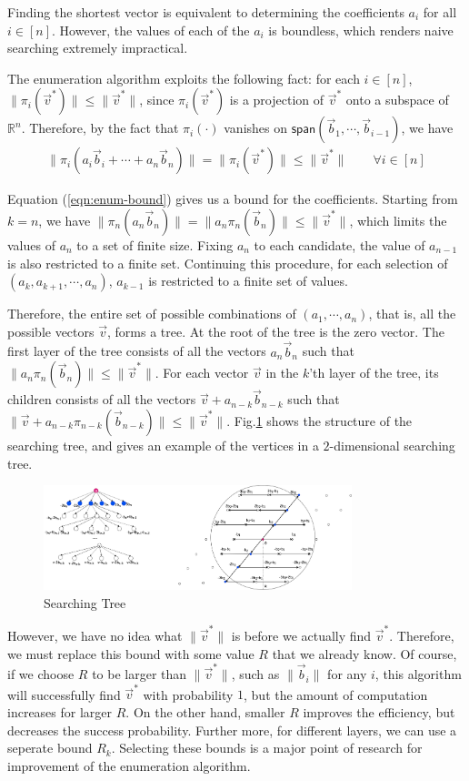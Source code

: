 \documentclass[11pt]{article}
\newcommand{\bbR}{\mathbb{R}}
\newcommand{\vb}{\vec{b}}
\newcommand{\vv}{\vec{v}}
\newcommand{\vvs}{\vec{v}^*}
\newcommand{\sspan}{\mathsf{span}}
\begin{document}
Finding the shortest vector is equivalent to determining the coefficients $a_i$ for all $i\in[n]$.
However, the values of each of the $a_i$ is boundless, which renders naive searching extremely impractical.

The enumeration algorithm exploits the following fact: for each $i\in[n]$, $\|\pi_i(\vvs)\|\leq\|\vvs\|$, since $\pi_i(\vvs)$ is a projection of $\vvs$ onto a subspace of $\bbR^n$.
Therefore, by the fact that $\pi_i(\cdot)$ vanishes on $\sspan(\vb_1,\cdots,\vb_{i-1})$, we have
\begin{eqnarray}
\|\pi_i(a_i\vb_i+\cdots+a_n\vb_n)\|=\|\pi_i(\vvs)\|\leq\|\vvs\|\qquad\forall i\in[n] \label{eqn:enum-bound}
\end{eqnarray}

Equation (\ref{eqn:enum-bound}) gives us a bound for the coefficients.
Starting from $k=n$, we have $\|\pi_n(a_n\vb_n)\|=\|a_n\pi_n(\vb_n)\|\leq\|\vvs\|$, which limits the values of $a_n$ to a set of finite size.
Fixing $a_n$ to each candidate, the value of $a_{n-1}$ is also restricted to a finite set.
Continuing this procedure, for each selection of $(a_k, a_{k+1}, \cdots, a_n)$, $a_{k-1}$ is restricted to a finite set of values.

Therefore, the entire set of possible combinations of $(a_1,\cdots,a_n)$, that is, all the possible vectors $\vv$, forms a tree.
At the root of the tree is the zero vector.
The first layer of the tree consists of all the vectors $a_n\vb_n$ such that $\|a_n\pi_n(\vb_n)\|\leq\|\vvs\|$.
For each vector $\vv$ in the $k$'th layer of the tree, its children consists of all the vectors $\vv+a_{n-k}\vb_{n-k}$ such that $\|\vv+a_{n-k}\pi_{n-k}(\vb_{n-k})\|\leq\|\vvs\|$.
Fig.\ref{fig:search-tree} shows the structure of the searching tree, and gives an example of the vertices in a $2$-dimensional searching tree.

\begin{figure}[ht!]
	\centering
	\includegraphics[width=0.8\textwidth]{files/BKZ-Searching-Tree.png}
	\caption{Searching Tree}
	\label{fig:search-tree}
\end{figure}

However, we have no idea what $\|\vvs\|$ is before we actually find $\vvs$.
Therefore, we must replace this bound with some value $R$ that we already know.
Of course, if we choose $R$ to be larger than $\|\vvs\|$, such as $\|\vb_i\|$ for any $i$, this algorithm will successfully find $\vvs$ with probability $1$, but the amount of computation increases for larger $R$.
On the other hand, smaller $R$ improves the efficiency, but decreases the success probability.
Further more, for different layers, we can use a seperate bound $R_k$.
Selecting these bounds is a major point of research for improvement of the enumeration algorithm.
\end{document}
